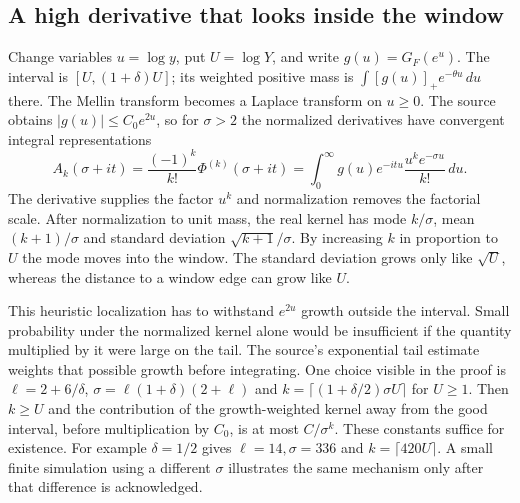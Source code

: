 \documentclass[12pt,letterpaper]{article}
\begin{document}
\subsection{A high derivative that looks inside the window}
Change variables \(u=\log y\), put \(U=\log Y\), and write \(g(u)=G_F(e^u)\). The interval is \([U,(1+\delta)U]\); its weighted positive mass is \(\int [g(u)]_+ e^{-\theta u}\,du\) there. The Mellin transform becomes a Laplace transform on \(u\ge0\). The source obtains \(|g(u)|\le C_0e^{2u}\), so for \(\sigma>2\) the normalized derivatives have convergent integral representations
\[
 A_k(\sigma+it)=\frac{(-1)^k}{k!}\Phi^{(k)}(\sigma+it)
 =\int_0^\infty g(u)e^{-itu}\frac{u^ke^{-\sigma u}}{k!}\,du .
\]
The derivative supplies the factor \(u^k\) and normalization removes the factorial scale. After normalization to unit mass, the real kernel has mode \(k/\sigma\), mean \((k+1)/\sigma\) and standard deviation \(\sqrt{k+1}/\sigma\). By increasing \(k\) in proportion to \(U\) the mode moves into the window. The standard deviation grows only like \(\sqrt U\), whereas the distance to a window edge can grow like \(U\).  

This heuristic localization has to withstand \(e^{2u}\) growth outside the interval. Small probability under the normalized kernel alone would be insufficient if the quantity multiplied by it were large on the tail. The source's exponential tail estimate weights that possible growth before integrating. One choice visible in the proof is \(\ell=2+6/\delta\), \(\sigma=\ell(1+\delta)(2+\ell)\) and \(k=\lceil(1+\delta/2)\sigma U\rceil\) for \(U\ge1\). Then \(k\ge U\) and the contribution of the growth-weighted kernel away from the good interval, before multiplication by \(C_0\), is at most \(C/\sigma^k\). These constants suffice for existence. For example \(\delta=1/2\) gives \(\ell=14,\sigma=336\) and \(k=\lceil420U\rceil\). A small finite simulation using a different \(\sigma\) illustrates the same mechanism only after that difference is acknowledged. 
\end{document}
